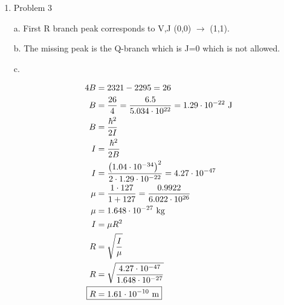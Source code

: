 \documentclass[12pt]{article}
\begin{document}
\begin{enumerate}
    b. 

    \begin{align*}
        \intertext{CO reduced mass}
        \mu &= \frac{m_1m_2}{m_1+m_2} \\
        \mu &= \frac{12 \cdot 16}{12+16} \cdot \frac{1}{6.022\cdot10^{23}} \cdot \frac{1}{1000} \\
        \mu &= 1.139 \cdot 10^{-26} \\
        \intertext{Reduced mass from inertial moment}
        I &= \mu R^2 \\
        \mu &= \frac{I}{R^2} \\
        & R = 1.1281\cdot10^{-10} \\
        \mu &= \frac{1.451\cdot10^{-46}}{\left(1.1281\cdot10^{-10}\right)^2} \\
        \mu &= 1.140 \cdot 10^{-26}
    \end{align*}

    The two masses are approximately the same. This molecule is $^{12}$C$^{16}$O.
    
    \newpage
    \item Problem 3
    
    a. First R branch peak corresponds to V,J (0,0) $\rightarrow$ (1,1).

    b. The missing peak is the Q-branch which is J=0 which is not allowed.

    c.

    \begin{align*}
        4B &= 2321 - 2295 = 26 \\
        B &= \frac{26}{4} = \frac{6.5}{5.034\cdot10^{22}} = 1.29\cdot10^{-22} \text{ J} \\
        B &= \frac{\hbar^2}{2I} \\
        I &= \frac{\hbar^2}{2B} \\
        I &= \frac{\left(1.04\cdot10^{-34}\right)^2}{2\cdot1.29\cdot10^{-22}} = 4.27\cdot10^{-47} \\
        \mu &= \frac{1\cdot127}{1+127} = \frac{0.9922}{6.022\cdot10^{26}} \\
        \mu &= 1.648\cdot10^{-27} \text{ kg} \\
        I &= \mu R^2 \\
        R &= \sqrt{\frac{I}{\mu}} \\
        R &= \sqrt{\frac{4.27\cdot10^{-47}}{1.648\cdot10^{-27}}} \\
        \Aboxed{R &= 1.61\cdot10^{-10} \text{ m}}
    \end{align*}


\end{enumerate}
\end{document}
